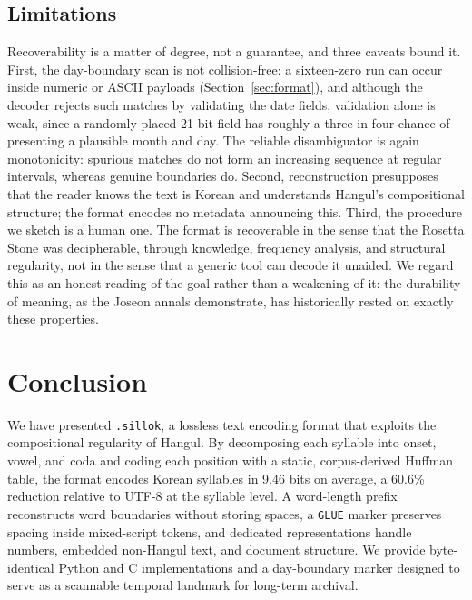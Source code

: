 \documentclass[conference]{IEEEtran}
\begin{document}
\subsection{Limitations}

Recoverability is a matter of degree, not a guarantee, and three caveats bound
it. First, the day-boundary scan is not collision-free: a sixteen-zero run can
occur inside numeric or ASCII payloads (Section~\ref{sec:format}), and although
the decoder rejects such matches by validating the date fields, validation alone
is weak, since a randomly placed 21-bit field has roughly a three-in-four chance
of presenting a plausible month and day. The reliable disambiguator is again
monotonicity: spurious matches do not form an increasing sequence at regular
intervals, whereas genuine boundaries do. Second, reconstruction presupposes
that the reader knows the text is Korean and understands Hangul's compositional
structure; the format encodes no metadata announcing this. Third, the procedure
we sketch is a human one. The format is recoverable in the sense that the
Rosetta Stone was decipherable, through knowledge, frequency analysis, and
structural regularity, not in the sense that a generic tool can decode it
unaided. We regard this as an honest reading of the goal rather than a
weakening of it: the durability of meaning, as the Joseon annals demonstrate,
has historically rested on exactly these properties.

\section{Conclusion}
\label{sec:conclusion}

We have presented \texttt{.sillok}, a lossless text encoding format that
exploits the compositional regularity of Hangul. By decomposing each syllable
into onset, vowel, and coda and coding each position with a static,
corpus-derived Huffman table, the format encodes Korean syllables in 9.46 bits
on average, a 60.6\% reduction relative to UTF-8 at the syllable level. A
word-length prefix reconstructs word boundaries without storing spaces, a
\texttt{GLUE} marker preserves spacing inside mixed-script tokens, and dedicated
representations handle numbers, embedded non-Hangul text, and document
structure. We provide byte-identical Python and C implementations and a
day-boundary marker designed to serve as a scannable temporal landmark for
long-term archival.
\end{document}
